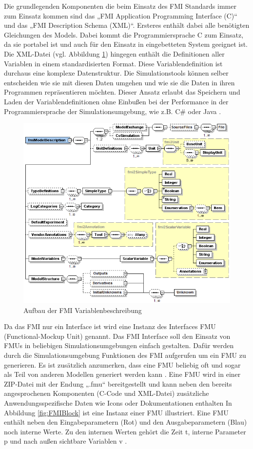 Die grundlegenden Komponenten die beim Einsatz des FMI Standards immer zum Einsatz kommen sind das „FMI Application Programming Interface (C)“ und das „FMI Description Schema (XML)“. Ersteres enthält dabei alle benötigten Gleichungen des Models. Dabei kommt die Programmiersprache C zum Einsatz, da sie portabel ist und auch für den Einsatz in eingebetteten System geeignet ist. Die XML-Datei (vgl. Abbildung \ref{fig:FMIOverview}) hingegen enthält die Definitionen aller Variablen in einem standardisierten Format. Diese Variablendefinition ist durchaus eine komplexe Datenstruktur. Die Simulationstools können selber entscheiden wie sie mit diesen Daten umgehen und wie sie die Daten in ihren Programmen repräsentieren möchten. Dieser Ansatz erlaubt das Speichern und Laden der Variablendefinitionen ohne Einbußen bei der Performance in der Programmiersprache der Simulationsumgebung, wie z.B. C\# oder Java \cite[S.8]{25}.
\newpage
\begin{figure}[h]
	\centering
	\includegraphics[width=0.7\linewidth]{Bilder/A20_FMIOverview}
	\caption{Aufbau der FMI Variablenbeschreibung \cite[S.30]{25}}
	\label{fig:FMIOverview}
\end{figure}
\noindent Da das FMI nur ein Interface ist wird eine Instanz des Interfaces FMU (Functional-Mockup Unit) genannt. Das FMI Interface soll den Einsatz von FMUs in beliebigen Simulationsumgebungen einfach gestalten. Dafür werden durch die Simulationsumgebung Funktionen des FMI aufgerufen um ein FMU zu generieren. Es ist zusätzlich anzumerken, dass eine FMU beliebig oft und sogar als Teil von anderen Modellen generiert werden kann \cite[S.8]{25}. Eine FMU wird in einer ZIP-Datei mit der Endung „.fmu“ bereitgestellt und kann neben den bereits angesprochenen Komponenten (C-Code und XML-Datei) zusätzliche Anwendungsspezifische Daten wie Icons oder Dokumentationen enthalten \cite[S.4+9]{25} In Abbildung \ref{fig:FMIBlock} ist eine Instanz einer FMU illustriert. Eine FMU enthält neben den Eingabeparametern (Rot) und den Ausgabeparametern (Blau) noch interne Werte. Zu den internen Werten gehört die Zeit t, interne Parameter p und nach außen sichtbare Variablen v \cite[S.8]{25}.
